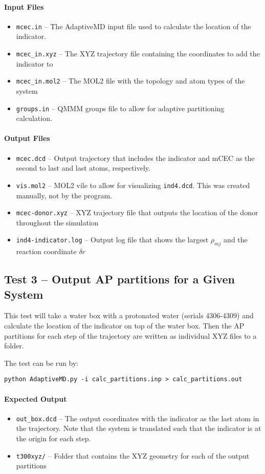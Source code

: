 \documentclass{article}
\begin{document}
\paragraph{Input Files}
\begin{itemize}
\item \texttt{mcec.in} -- The AdaptiveMD input file used to calculate the location of the indicator.
\item \texttt{mcec\_in.xyz} -- The XYZ trajectory file containing the coordinates to add the indicator to
\item \texttt{mcec\_in.mol2} -- The MOL2 file with the topology and atom types of the system
\item \texttt{groups.in} -- \textsc{QMMM} groups file to allow for adaptive partitioning calculation.
\end{itemize}

\paragraph{Output Files}
\begin{itemize}
\item \texttt{mcec.dcd} -- Output trajectory that includes the indicator and mCEC as the second to last and last atoms, respectively.
\item \texttt{vis.mol2} -- MOL2 vile to allow for visualizing \texttt{ind4.dcd}. This was created manually, not by the program.
\item \texttt{mcec-donor.xyz} -- XYZ trajectory file that outputs the location of the donor throughout the simulation
\item \texttt{ind4-indicator.log} -- Output log file that shows the largest $\rho_{mj}$ and the reaction coordinate $\delta r$
\end{itemize}

\subsection{Test 3 -- Output AP partitions for a Given System}
This test will take a water box with a protonated water (serials 4306-4309) and calculate the location of the indicator on top of the water box.
Then the AP partitions for each step of the trajectory are written as individual XYZ files to a folder.

The test can be run by:

\texttt{python AdaptiveMD.py -i calc\_partitions.inp > calc\_partitions.out}

\paragraph{Expected Output}
\begin{itemize}
\item \texttt{out\_box.dcd} -- The output coordinates with the indicator as the last atom in the trajectory.
Note that the system is translated such that the indicator is at the origin for each step.
\item \texttt{t300xyz/} -- Folder that contains the XYZ geometry for each of the output partitions
\end{itemize}
\end{document}
